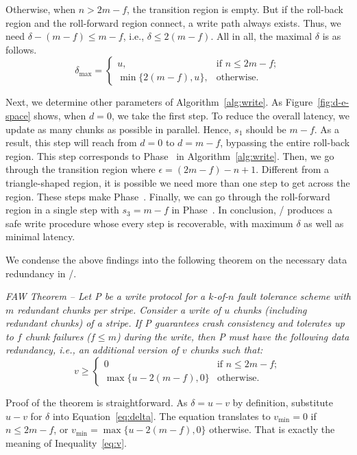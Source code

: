 Otherwise, when $n > 2m - f$, the transition region is empty. But if the
roll-back region and the roll-forward region connect, a write path 
always exists. Thus, we need
$\delta - (m - f) \le m - f$, i.e., $\delta \le 2(m
- f)$. All in all, the maximal $\delta$ is as follows.
\begin{equation}
\delta_{\max} =
\begin{cases}
u, & \text{if } n \le 2m-f;\\
\min\{2(m-f), u\}, & \text{otherwise.}
\end{cases}
\label{eq:delta}
\end{equation}

Next, we determine other parameters of
Algorithm~\ref{alg:write}. As Figure~\ref{fig:d-e-space} shows, when $d = 0$,
we take the first step. To reduce the overall latency, we update as many chunks
as possible in parallel. Hence, $s_1$ should be $m-f$.  As a result,
this step will reach from $d=0$ to $d=m-f$, bypassing the entire roll-back region. This
step corresponds to Phase~ in Algorithm~\ref{alg:write}. Then, we
go through the transition region where $\epsilon = (2m - f) - n + 1$.
Different from a triangle-shaped region, it is possible we need more than one
step to get across the region. These steps make Phase~. Finally, we
can go through the roll-forward region in a single step with $s_3=m-f$ in
Phase~. In conclusion, \protocol/ produces a safe write procedure
whose every step is recoverable, with maximum $\delta$ as well as minimal latency.

We condense the above findings into the following theorem on the necessary
data redundancy in \protocol/.

\emph{FAW Theorem -- Let P be a write protocol for a $k$-of-$n$ fault tolerance
scheme with $m$ redundant chunks per stripe. Consider a write of $u$
chunks (\emph{including} redundant chunks) of a stripe. If P guarantees crash
consistency and tolerates up to $f$ chunk failures ($f \le m$) during the
write, then P must have the following data redundancy, i.e., an additional
version of $v$ chunks such that:}
\begin{equation}
v \ge
\begin{cases}
  0 & \text{if } n \le 2m-f;\\
  \max\{u - 2(m - f), 0\} & \text{otherwise.}
\end{cases}
\label{eq:v}
\end{equation}

Proof of the theorem is straightforward. As $\delta = u - v$ by definition,
substitute $u - v$ for $\delta$ into Equation~\ref{eq:delta}. The equation
translates to $v_{\min} = 0$ if $n \le 2m - f$, or $v_{\min} = \max\{u - 2(m - f), 0\}$
otherwise. That is exactly the meaning of Inequality~\ref{eq:v}.


